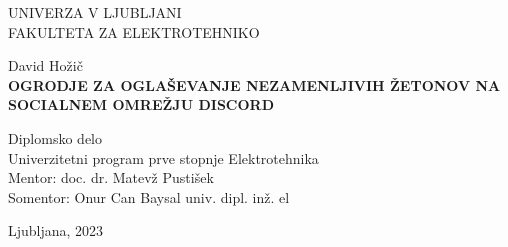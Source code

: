 \begin{titlepage}
    \thispagestyle{empty} 

        \begin{center}
        {\large 
        UNIVERZA V LJUBLJANI\\
        FAKULTETA ZA ELEKTROTEHNIKO\\
        }

        \vspace{3cm}
        {\LARGE David Hožič}\\

        \vspace{2cm}
        {\textbf{\LARGE 
        OGRODJE ZA OGLAŠEVANJE NEZAMENLJIVIH ŽETONOV
        NA SOCIALNEM OMREŽJU DISCORD\\ 
        }}

        \vspace{2cm}
        {\Large Diplomsko delo}\\
        
        \vspace{1cm}
        {\Large Univerzitetni program prve stopnje Elektrotehnika}\\

        \vspace{2cm}
        {\Large Mentor: doc. dr. Matevž Pustišek}\\
        {\Large Somentor: Onur Can Baysal univ. dipl. inž. el}

        \vfill
        {\Large Ljubljana, 2023}
        \end{center}
        \ \thispagestyle{empty}
\end{titlepage}

